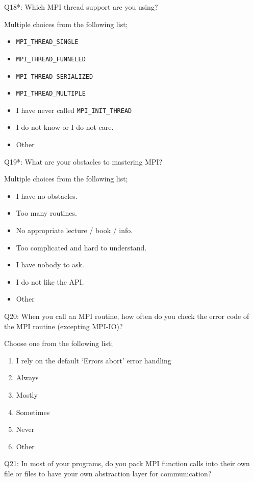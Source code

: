 \begin{description}
\item{Q18*:} Which MPI thread support are you using?

Multiple choices from the following list;
\begin{itemize}
\item {\tt MPI\_THREAD\_SINGLE}
\item {\tt MPI\_THREAD\_FUNNELED}
\item {\tt MPI\_THREAD\_SERIALIZED}
\item {\tt MPI\_THREAD\_MULTIPLE}
\item I have never called {\tt MPI\_INIT\_THREAD}
\item I do not know or I do not care.
\item Other
\end{itemize}

\item{Q19*:} What are your obstacles to mastering MPI?

Multiple choices from the following list;
\begin{itemize}
\item I have no obstacles.
\item Too many routines.
\item No appropriate lecture / book / info.
\item Too complicated and hard to understand.
\item I have nobody to ask.
\item I do not like the API.
\item Other
\end{itemize}

\item{Q20:} When you call an MPI routine, how often do you check the error code of the MPI routine  (excepting MPI-IO)?

Choose one from the following list;
\begin{enumerate}
\item I rely on the default ‘Errors abort’ error handling
\item Always
\item Mostly
\item Sometimes
\item Never
\item Other
\end{enumerate}

\item{Q21:} In most of your programs, do you pack MPI function calls into their own file or files to have your own abstraction layer for communication?


\end{description}
